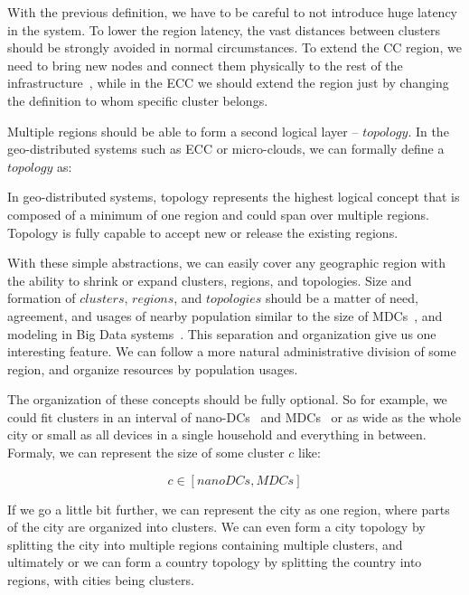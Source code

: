 With the previous definition, we have to be careful to not introduce huge latency in the system. To lower the region latency, the vast distances between clusters should be strongly avoided in normal circumstances. To extend the CC region, we need to bring new nodes and connect them physically to the rest of the infrastructure~\cite{Hamilton07}, while in the ECC we should extend the region just by changing the definition to whom specific cluster belongs.

Multiple regions should be able to form a second logical layer -- $topology$. In the geo-distributed systems such as ECC or micro-clouds, we can formally define a $topology$ as:

\begin{definition}
In geo-distributed systems, topology represents the highest logical concept that is composed of a minimum of one region and could span over multiple regions. Topology is fully capable to accept new or release the existing regions. 
\end{definition}

With these simple abstractions, we can easily cover any geographic region with the ability to shrink or expand clusters, regions, and topologies. Size and formation of $clusters$, $regions$, and $topologies$ should be a matter of need, agreement, and usages of nearby population similar to the size of MDCs~\cite{GreenbergHMP09}, and modeling in Big Data systems~\cite{SonbolOAA20, WangCAL14}. This separation and organization give us one interesting feature. We can follow a more natural administrative division of some region, and organize resources by population usages.

The organization of these concepts should be fully optional. So for example, we could fit clusters in an interval of nano-DCs~\cite{inbookKurniawan} and MDCs~\cite{GreenbergHMP09} or as wide as the whole city or small as all devices in a single household and everything in between. Formaly, we can represent the size of some cluster $c$ like:

\begin{equation}
	c \in \left[ nano DCs, MDCs \right]
\end{equation}

\noindent
If we go a little bit further, we can represent the city as one region, where parts of the city are organized into clusters. We can even form a city topology by splitting the city into multiple regions containing multiple clusters, and ultimately or we can form a country topology by splitting the country into regions, with cities being clusters.\\ 

